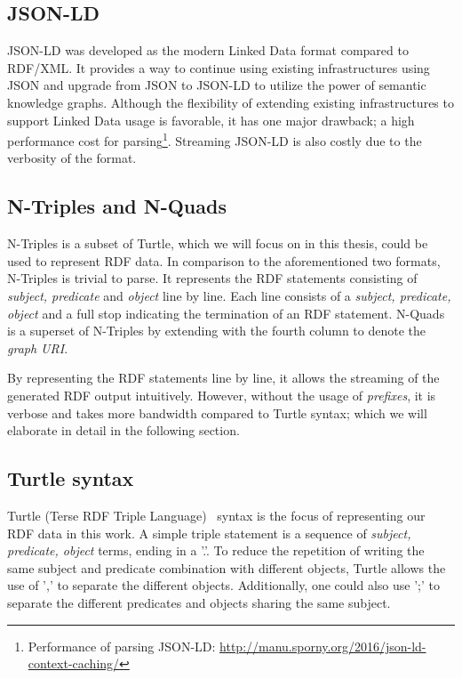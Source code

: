 \subsection{JSON-LD}
JSON-LD\cite{JSON-LD} was developed as 
the modern Linked Data format compared to RDF/XML. It provides a way to continue using existing 
infrastructures using JSON and upgrade from JSON to JSON-LD to utilize the power of semantic knowledge graphs. 
Although the flexibility of extending existing infrastructures to support Linked Data usage 
is favorable, it has one major drawback; a high performance cost for parsing\footnote{Performance of parsing JSON-LD: \url{http://manu.sporny.org/2016/json-ld-context-caching/}}.
Streaming JSON-LD is also costly due to the verbosity of the format. 


\subsection{N-Triples and N-Quads}
N-Triples\cite{N-Triples} is a subset of Turtle, which we will focus on in this thesis, could be used 
to represent RDF data. In comparison to the aforementioned two formats, N-Triples is trivial to parse. 
It represents the RDF statements consisting of \emph{subject, predicate} and \emph{object} line by line. 
Each line consists of a \emph{subject, predicate, object} and a full stop indicating the termination of 
an RDF statement. N-Quads is a superset  of N-Triples by extending with the fourth column to denote the \emph{graph URI}.

By representing the RDF statements line by line, it allows the streaming of the generated RDF output 
intuitively. However, without the usage of \emph{prefixes}, it is verbose and takes more 
bandwidth compared to Turtle syntax; which we will elaborate in detail in the following section.

\subsection{Turtle syntax}
\label{sec:turtle_syntax}
Turtle (Terse RDF Triple Language)~\cite{turtle_syntax}
syntax is the focus of representing our RDF data in this work.
 A simple triple statement is a sequence of
\textit{subject, predicate, object} terms, ending in a '.'.
To reduce the repetition of writing the same subject and predicate combination with
different objects, Turtle allows the use of ',' to separate the different objects.
Additionally, one could also use ';' to separate the different predicates and objects sharing the
same subject. 


